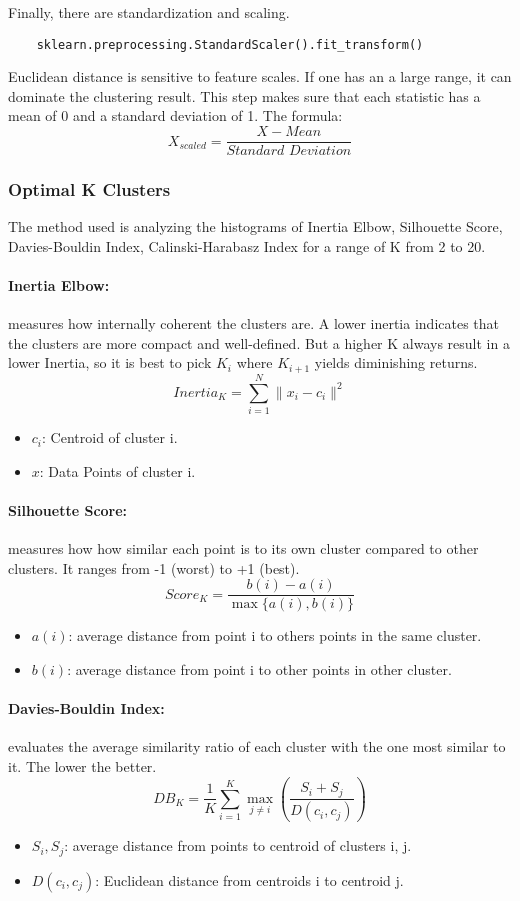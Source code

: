\documentclass{report}
\begin{document}
Finally, there are standardization and scaling.
\begin{verbatim}
    sklearn.preprocessing.StandardScaler().fit_transform()
\end{verbatim}
Euclidean distance is sensitive to feature scales. If one has an a large range, it can dominate the 
clustering result. This step makes sure that each statistic has a mean of 0 and a standard deviation 
of 1. The formula:
\[ X_{scaled} = \frac{X - Mean}{\textit{Standard Deviation}} \]

\subsubsection{Optimal K Clusters}
The method used is analyzing the histograms of Inertia Elbow, Silhouette Score, Davies-Bouldin Index,
Calinski-Harabasz Index for a range of K from 2 to 20.

\paragraph{Inertia Elbow:} measures how internally coherent the clusters are. A lower inertia 
indicates that the clusters are more compact and well-defined. But a higher K always result in a lower
Inertia, so it is best to pick $K_i$ where $K_{i+1}$ yields diminishing returns.
\[ Inertia_K = \sum_{i=1}^{N} \| x_i - c_i \|^2 \]
\begin{itemize}
    \item \( c_i \): Centroid of cluster i. 
    \item \( x \): Data Points of cluster i.
\end{itemize}

\paragraph{Silhouette Score:} measures how how similar each point is to its own cluster compared to 
other clusters. It ranges from -1 (worst) to +1 (best).
\[ Score_K = \frac{b(i) - a(i)}{\max\{a(i), b(i)\}} \]
\begin{itemize}
    \item \( a(i) \): average distance from point i to others points in the same cluster.
    \item \( b(i) \): average distance from point i to other points in other cluster.
\end{itemize}

\paragraph{Davies-Bouldin Index:}  evaluates the average similarity ratio of each cluster with the one 
most similar to it. The lower the better.
\[ DB_K = \frac{1}{K} \sum_{i=1}^{K} \max_{j \neq i} \left( \frac{S_i + S_j}{D(c_i, c_j)} \right) \]
\begin{itemize}
    \item \( S_i, S_j \): average distance from points to centroid of clusters i, j.
    \item \( D(c_i, c_j) \): Euclidean distance from centroids i to centroid j.
\end{itemize}
\end{document}
